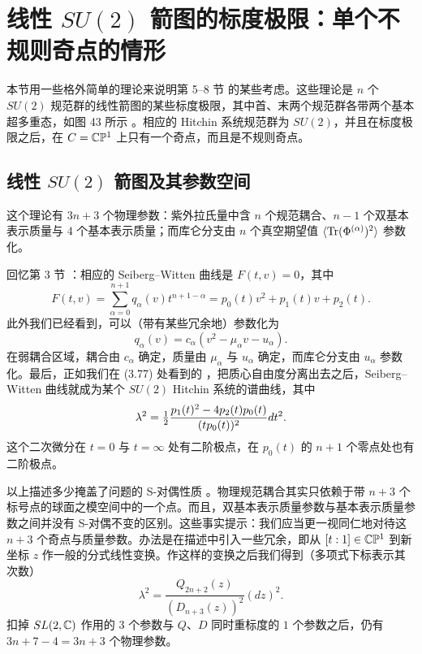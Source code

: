 \section{线性 $SU(2)$ 箭图的标度极限：单个不规则奇点的情形}\label{section:Superconformal}


本节用一些格外简单的理论来说明第 5–8 节%
的某些考虑。这些理论是 $n$ 个 $SU(2)$ 规范群的线性箭图的某些标度极限，其中首、末两个规范群各带两个基本超多重态，如图 43 所示%
。相应的 Hitchin 系统规范群为 $SU(2)$，并且在标度极限之后，在 $C = \mathbb{C}\mathbb{P}^1$ 上只有一个奇点，而且是不规则奇点。

\subsection{线性 $SU(2)$ 箭图及其参数空间}

这个理论有 $3n+3$ 个物理参数：紫外拉氏量中含 $n$ 个规范耦合、$n-1$ 个双基本表示质量与 $4$ 个基本表示质量；而库仑分支由 $n$ 个真空期望值 $\langle {\operatorname{Tr}}(\Phi^{(\alpha)})^2 \rangle$ 参数化。

回忆第 3 节%
：相应的 Seiberg–Witten 曲线是 $F(t, v) = 0$，其中
\begin{equation}\label{eq:ch11-Ftv}
F(t,v) = \sum_{\alpha=0}^{n+1} q_\alpha (v) t^{n+1-\alpha} = p_0(t) v^2 + p_1(t) v + p_2(t).
\end{equation}
此外我们已经看到，可以（带有某些冗余地）参数化为
\begin{equation}\label{eq:ch11-qalpha}
q_\alpha(v) = c_\alpha (v^2 - \mu_\alpha v - u_\alpha).
\end{equation}
在弱耦合区域，耦合由 $c_\alpha$ 确定，质量由 $\mu_\alpha$ 与 $u_\alpha$ 确定，而库仑分支由 $u_\alpha$ 参数化。最后，正如我们在 (3.77) 处看到的%
，把质心自由度分离出去之后，Seiberg–Witten 曲线就成为某个 $SU(2)$ Hitchin 系统的谱曲线，其中
\begin{equation}\label{eq:ch11-lambda2}
\lambda^2 = \tfrac{1}{2} \frac{p_1(t)^2 - 4 p_2(t) p_0(t) }{(t p_0(t))^2} dt^2.
\end{equation}
这个二次微分在 $t = 0$ 与 $t = \infty$ 处有二阶极点，在 $p_0(t)$ 的 $n+1$ 个零点处也有二阶极点。

以上描述多少掩盖了问题的 S-对偶性质 \cite{Witten:1997sc,Gaiotto:2009we}。物理规范耦合其实只依赖于带 $n+3$ 个标号点的球面之模空间中的一个点。而且，双基本表示质量参数与基本表示质量参数之间并没有 S-对偶不变的区别。这些事实提示：我们应当更一视同仁地对待这 $n+3$ 个奇点与质量参数。办法是在描述中引入一些冗余，即从 $[t:1] \in \mathbb{C}\mathbb{P}^1$ 到新坐标 $z$ 作一般的分式线性变换。作这样的变换之后我们得到（多项式下标表示其次数）
\begin{equation}\label{eq:quad-diff-1}
\lambda^2 = \frac{Q_{2n+2}(z)}{(D_{n+3}(z))^2} (dz)^2.
\end{equation}
扣掉 $SL(2,\mathbb{C})$ 作用的 $3$ 个参数与 $Q$、$D$ 同时重标度的 $1$ 个参数之后，仍有 $3n + 7 - 4 = 3n+3$ 个物理参数。

